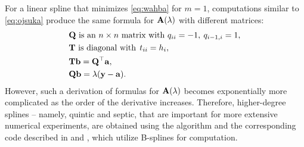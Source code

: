 \documentclass[11pt,leqno]{book}
\theoremstyle{definition}
\theoremstyle{plain}
\theoremstyle{definition}
\begin{document}
{For a linear spline that minimizes \eqref{eq:wahba} for $m=1$, computations similar to \eqref{eq:ojsuka} produce the same formula for $\vb{A}(\lambda)$ with different matrices:
\begin{equation}
\begin{aligned}
&\vb{Q}\text{ is an $ n \times n $ matrix with }  q_{ii}=-1,\:q_{i-1,i} =1,\\
&\vb{T}\text{ is diagonal with}\:\:t_{ii} = h_i,\\
&\vb{Tb}=\vb{Q^\top a},\\
&\vb{Qb}=\lambda(\vb{y}-\vb{a}).
\end{aligned}
\label{eq:lineareqs}
\end{equation}
However, such a derivation of formulas for $\vb{A}(\lambda)$ becomes exponentially more complicated as the order of the derivative increases. Therefore, higher-degree splines -- namely, quintic and septic, that are important for more extensive numerical experiments, are obtained using the algorithm and the corresponding code described in \cite{hisaps1} and \cite{hisaps2}, which utilize B-splines for computation.

}
\end{document}
